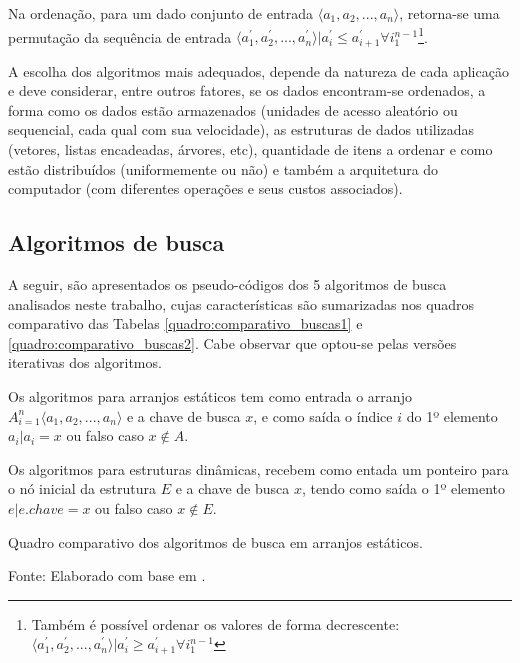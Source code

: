\documentclass[12pt]{article}
\begin{document}
Na ordenação, para um dado conjunto de entrada $\langle a_{1}, a_{2}, ..., a_{n} \rangle$, retorna-se uma permutação da sequência de entrada $\langle a^{'}_{1}, a^{'}_{2}, ..., a^{'}_{n} \rangle \vert a^{'}_{i} \leq a^{'}_{i+1} \forall i_{1}^{n-1}$\cite{cormen_algoritmos:_2012}\footnote{Também é possível ordenar os valores de forma decrescente: $\langle a^{'}_{1}, a^{'}_{2}, ..., a^{'}_{n} \rangle \vert a^{'}_{i} \geq a^{'}_{i+1} \forall i_{1}^{n-1}$}.

A escolha dos algoritmos mais adequados, depende da natureza de cada aplicação e deve considerar, entre outros fatores, se os dados encontram-se ordenados, a forma como os dados estão armazenados (unidades de acesso aleatório ou sequencial, cada qual com sua velocidade), as estruturas de dados utilizadas (vetores, listas encadeadas, árvores, etc), quantidade de itens a ordenar e como estão distribuídos (uniformemente ou não) e também a arquitetura do computador (com diferentes operações e seus custos associados).

\subsection{Algoritmos de busca} \label{sec:algoritmos}

A seguir, são apresentados os pseudo-códigos dos 5 algoritmos de busca analisados neste trabalho, cujas características são sumarizadas nos quadros comparativo das Tabelas \ref{quadro:comparativo_buscas1} e \ref{quadro:comparativo_buscas2}. Cabe observar que optou-se pelas versões iterativas dos algoritmos.

Os algoritmos para arranjos estáticos tem como entrada o arranjo $ A^n_{i=1} \langle a_{1}, a_{2}, ..., a_{n} \rangle $ e a chave de busca $ x $, e como saída o índice $ i $ do 1º elemento $ a_{i} \vert a_{i} = x $ ou falso caso $ x \notin A $.

Os algoritmos para estruturas dinâmicas, recebem como entada um ponteiro para o nó inicial da estrutura $ E $ e a chave de busca $ x $, tendo como saída o 1º elemento $ e \vert e.chave = x $ ou falso caso $ x \notin E $.







\begin{table}[h]
    \centering
    \resizebox{\textwidth}{!}{
        
    }
    \caption{Quadro comparativo dos algoritmos de busca em arranjos estáticos.}
    \small{Fonte: Elaborado com base em \cite{sultana_brief_2017}.}
    \label{quadro:comparativo_buscas1}
\end{table}
\end{document}
